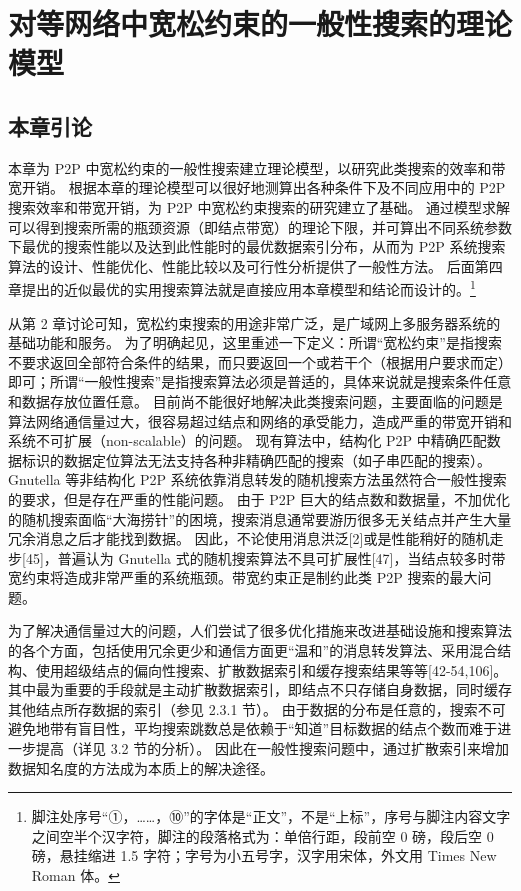 \documentclass{thuthesis}
\begin{document}
\START
\showoutput

\mainmatter

\setcounter{chapter}{2}
\chapter{对等网络中宽松约束的一般性搜索的理论模型}

\section{本章引论}

本章为 P2P 中宽松约束的一般性搜索建立理论模型，以研究此类搜索的效率和带宽开销。
根据本章的理论模型可以很好地测算出各种条件下及不同应用中的 P2P 搜索效率和带宽开销，为 P2P 中宽松约束搜索的研究建立了基础。
通过模型求解可以得到搜索所需的瓶颈资源（即结点带宽）的理论下限，并可算出不同系统参数下最优的搜索性能以及达到此性能时的最优数据索引分布，从而为 P2P 系统搜索算法的设计、性能优化、性能比较以及可行性分析提供了一般性方法。
后面第四章提出的近似最优的实用搜索算法就是直接应用本章模型和结论而设计的。\footnote{%
  脚注处序号“①，……，⑩”的字体是“正文”，不是“上标”，序号与脚注内容文字之间空半个汉字符，脚注的段落格式为：单倍行距，段前空 0 磅，段后空 0 磅，悬挂缩进 1.5 字符；字号为小五号字，汉字用宋体，外文用 Times New Roman 体。
}

从第 2 章讨论可知，宽松约束搜索的用途非常广泛，是广域网上多服务器系统的基础功能和服务。
为了明确起见，这里重述一下定义：所谓“宽松约束”是指搜索不要求返回全部符合条件的结果，而只要返回一个或若干个（根据用户要求而定）即可；所谓“一般性搜索”是指搜索算法必须是普适的，具体来说就是搜索条件任意和数据存放位置任意。
目前尚不能很好地解决此类搜索问题，主要面临的问题是算法网络通信量过大，很容易超过结点和网络的承受能力，造成严重的带宽开销和系统不可扩展（non-scalable）的问题。
现有算法中，结构化 P2P 中精确匹配数据标识的数据定位算法无法支持各种非精确匹配的搜索（如子串匹配的搜索）。
Gnutella 等非结构化 P2P 系统依靠消息转发的随机搜索方法虽然符合一般性搜索的要求，但是存在严重的性能问题。
由于 P2P 巨大的结点数和数据量，不加优化的随机搜索面临“大海捞针”的困境，搜索消息通常要游历很多无关结点并产生大量冗余消息之后才能找到数据。
因此，不论使用消息洪泛[2]或是性能稍好的随机走步[45]，普遍认为 Gnutella 式的随机搜索算法不具可扩展性[47]，当结点较多时带宽约束将造成非常严重的系统瓶颈。带宽约束正是制约此类 P2P 搜索的最大问题。

为了解决通信量过大的问题，人们尝试了很多优化措施来改进基础设施和搜索算法的各个方面，包括使用冗余更少和通信方面更“温和”的消息转发算法、采用混合结构、使用超级结点的偏向性搜索、扩散数据索引和缓存搜索结果等等[42-54,106]。
其中最为重要的手段就是主动扩散数据索引，即结点不只存储自身数据，同时缓存其他结点所存数据的索引（参见 2.3.1 节）。
由于数据的分布是任意的，搜索不可避免地带有盲目性，平均搜索跳数总是依赖于“知道”目标数据的结点个数而难于进一步提高（详见 3.2 节的分析）。
因此在一般性搜索问题中，通过扩散索引来增加数据知名度的方法成为本质上的解决途径。
\end{document}
